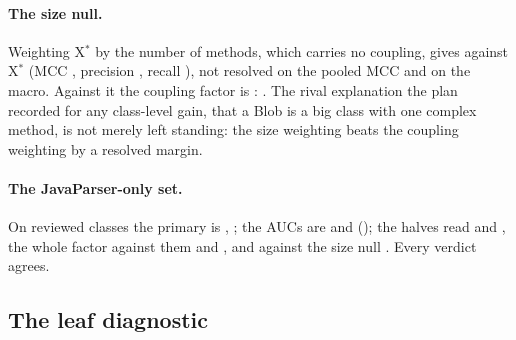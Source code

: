 \documentclass[11pt,a4paper]{article}
\newcommand{\fitwidth}[1]{\resizebox{\ifdim\width>\textwidth\textwidth\else\width\fi}{!}{#1}}
\newcommand{\Xs}{X$^*$}
\newcommand{\Xm}{X$^*_m$}
\begin{document}
\paragraph{The size null.} Weighting \Xs{} by the number of methods, which
carries no coupling, gives \primNvsXMicro{} against \Xs{} (MCC
\primNMcc{}, precision \primNPrecision{}, recall \primNRecall{}), not
resolved on the pooled MCC and \primNvsXMacro{} on the macro. Against it the
coupling factor is \textbf{\primDvsNMicro{}}: \primDvsNReading{}. The
rival explanation the plan recorded for any class-level gain, that a Blob is
a big class with one complex method, is not merely left standing: the size
weighting beats the coupling weighting by a resolved margin.

\paragraph{The JavaParser-only set.} On \primJpUniv{} reviewed classes the
primary is \primJpMicro{}, \primJpVerdict{}; the AUCs are \primJpAucX{}
and \primJpAucD{} (\primJpAucDiff{}); the halves read \primJpEMicro{} and
\primJpAmpMicro{}, the whole factor against them \primJpDvsEMicro{} and
\primJpDvsAMicro{}, and against the size null \primJpDvsNMicro{}. Every
verdict agrees.

\subsection{The leaf diagnostic}
\label{sec:leaf}

\begin{table}[t]
\centering
\caption{The leaf diagnostic: among the reviewed units \Xs{} (or \Xm{})
flags, how many are catchments ($d < 0$), how many of those the reviewers
call positive, the same for the rest, and the paired difference in positive
rate (catchments minus the rest) with its interval over repositories. The
exemption is supported by an upper bound below 0 and contradicted by a
lower bound above 0.}
\label{tab:leaf}
\small
\setlength{\tabcolsep}{4pt}
\fitwidth{}
\end{table}
\end{document}
